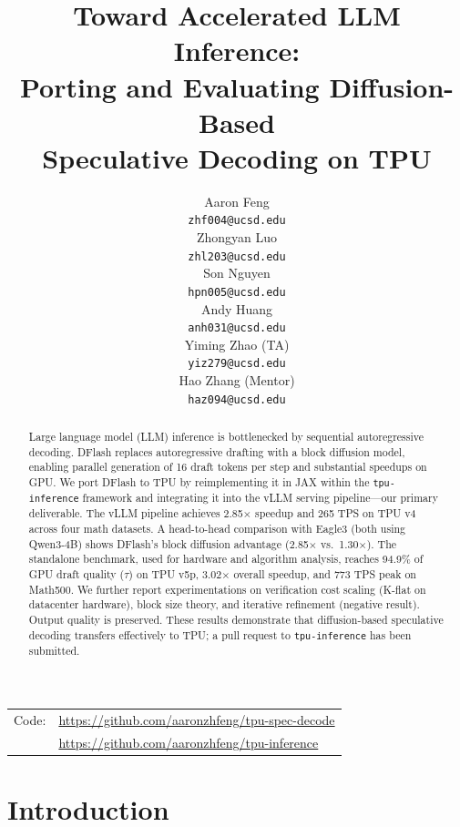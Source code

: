 \documentclass[12pt,letterpaper]{article}
\title{
Toward Accelerated LLM Inference:\\
Porting and Evaluating Diffusion-Based\\
Speculative Decoding on TPU
}
\author{Aaron Feng \\
  {\tt zhf004@ucsd.edu} \\\And
  Zhongyan Luo \\
  {\tt zhl203@ucsd.edu} \\\And
  Son Nguyen \\
  {\tt hpn005@ucsd.edu} \\\And
  Andy Huang \\
  {\tt anh031@ucsd.edu} \\\AND
  Yiming Zhao (TA) \\
  {\tt yiz279@ucsd.edu} \\\And
  Hao Zhang (Mentor) \\
  {\tt haz094@ucsd.edu} \\}
\begin{document}
\maketitle


\begin{abstract}
Large language model (LLM) inference is bottlenecked by sequential autoregressive decoding. DFlash replaces autoregressive drafting with a block diffusion model, enabling parallel generation of 16 draft tokens per step and substantial speedups on GPU. We port DFlash to TPU by reimplementing it in JAX within the \texttt{tpu-inference} framework and integrating it into the vLLM serving pipeline---our primary deliverable. The vLLM pipeline achieves 2.85$\times$ speedup and 265 TPS on TPU v4 across four math datasets. A head-to-head comparison with Eagle3 (both using Qwen3-4B) shows DFlash's block diffusion advantage (2.85$\times$ vs.\ 1.30$\times$). The standalone benchmark, used for hardware and algorithm analysis, reaches 94.9\% of GPU draft quality ($\tau$) on TPU v5p, 3.02$\times$ overall speedup, and 773 TPS peak on Math500. We further report experimentations on verification cost scaling (K-flat on datacenter hardware), block size theory, and iterative refinement (negative result). Output quality is preserved. These results demonstrate that diffusion-based speculative decoding transfers effectively to TPU; a pull request to \texttt{tpu-inference} has been submitted.
\end{abstract}

\begin{center}
\begin{tabular}{r l}
Code: & \url{https://github.com/aaronzhfeng/tpu-spec-decode} \\
      & \url{https://github.com/aaronzhfeng/tpu-inference}
\end{tabular}
\end{center}


\clearpage

\maketoc
\clearpage


\section{Introduction}
\end{document}
